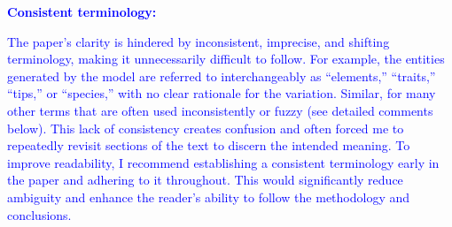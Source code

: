 \documentclass[
]{article}
\begin{document}

\textcolor{blue}{\textbf{Consistent terminology:}}

\textcolor{blue}{The paper's clarity is hindered by inconsistent, imprecise, and shifting terminology, making it unnecessarily difficult to follow.
For example, the entities generated by the model are referred to interchangeably as ``elements,'' ``traits,'' ``tips,'' or ``species,'' with no clear rationale for the variation.
Similar, for many other terms that are often used inconsistently or fuzzy (see detailed comments below).
This lack of consistency creates confusion and often forced me to repeatedly revisit sections of the text to discern the intended meaning.
To improve readability, I recommend establishing a consistent terminology early in the paper and adhering to it throughout.
This would significantly reduce ambiguity and enhance the reader's ability to follow the methodology and conclusions.}
\end{document}
